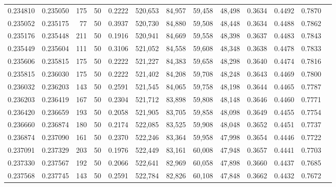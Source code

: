 \begin{tabular}{rrrrrrrrrrrrr}
0.234810 & 0.235050 &   175 &  50 &                                     0.2222 & 520,653 &  84,957 &  59,458 &  48,498 & 0.3634 & 0.4492 & 0.7870 \\
0.235052 & 0.235175 &    77 &  50 &                                     0.3937 & 520,730 &  84,880 &  59,508 &  48,448 & 0.3634 & 0.4488 & 0.7862 \\
0.235176 & 0.235448 &   211 &  50 &                                     0.1916 & 520,941 &  84,669 &  59,558 &  48,398 & 0.3637 & 0.4483 & 0.7843 \\
0.235449 & 0.235604 &   111 &  50 &                                     0.3106 & 521,052 &  84,558 &  59,608 &  48,348 & 0.3638 & 0.4478 & 0.7833 \\
0.235606 & 0.235815 &   175 &  50 &                                     0.2222 & 521,227 &  84,383 &  59,658 &  48,298 & 0.3640 & 0.4474 & 0.7816 \\
0.235815 & 0.236030 &   175 &  50 &                                     0.2222 & 521,402 &  84,208 &  59,708 &  48,248 & 0.3643 & 0.4469 & 0.7800 \\
0.236032 & 0.236203 &   143 &  50 &                                     0.2591 & 521,545 &  84,065 &  59,758 &  48,198 & 0.3644 & 0.4465 & 0.7787 \\
0.236203 & 0.236419 &   167 &  50 &                                     0.2304 & 521,712 &  83,898 &  59,808 &  48,148 & 0.3646 & 0.4460 & 0.7771 \\
0.236420 & 0.236659 &   193 &  50 &                                     0.2058 & 521,905 &  83,705 &  59,858 &  48,098 & 0.3649 & 0.4455 & 0.7754 \\
0.236660 & 0.236874 &   180 &  50 &                                     0.2174 & 522,085 &  83,525 &  59,908 &  48,048 & 0.3652 & 0.4451 & 0.7737 \\
0.236874 & 0.237090 &   161 &  50 &                                     0.2370 & 522,246 &  83,364 &  59,958 &  47,998 & 0.3654 & 0.4446 & 0.7722 \\
0.237091 & 0.237329 &   203 &  50 &                                     0.1976 & 522,449 &  83,161 &  60,008 &  47,948 & 0.3657 & 0.4441 & 0.7703 \\
0.237330 & 0.237567 &   192 &  50 &                                     0.2066 & 522,641 &  82,969 &  60,058 &  47,898 & 0.3660 & 0.4437 & 0.7685 \\
0.237568 & 0.237745 &   143 &  50 &                                     0.2591 & 522,784 &  82,826 &  60,108 &  47,848 & 0.3662 & 0.4432 & 0.7672 \\

\end{tabular}
